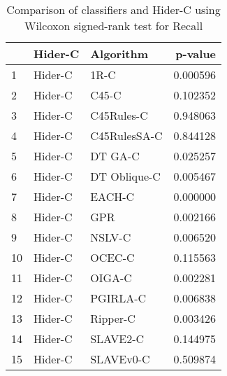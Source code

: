\begin{table}
\footnotesize
\caption{Comparison of classifiers and Hider-C using Wilcoxon signed-rank test for Recall}
\label{tab:Hider-C wilcoxon Recall comparison}
\begin{tabular}{lllr}
\hline
 & Hider-C & Algorithm & p-value \\
\hline
1 & Hider-C & 1R-C & 0.000596 \\
2 & Hider-C & C45-C & 0.102352 \\
3 & Hider-C & C45Rules-C & 0.948063 \\
4 & Hider-C & C45RulesSA-C & 0.844128 \\
5 & Hider-C & DT GA-C & 0.025257 \\
6 & Hider-C & DT Oblique-C & 0.005467 \\
7 & Hider-C & EACH-C & 0.000000 \\
8 & Hider-C & GPR & 0.002166 \\
9 & Hider-C & NSLV-C & 0.006520 \\
10 & Hider-C & OCEC-C & 0.115563 \\
11 & Hider-C & OIGA-C & 0.002281 \\
12 & Hider-C & PGIRLA-C & 0.006838 \\
13 & Hider-C & Ripper-C & 0.003426 \\
14 & Hider-C & SLAVE2-C & 0.144975 \\
15 & Hider-C & SLAVEv0-C & 0.509874 \\
\hline
\end{tabular}
\end{table}
